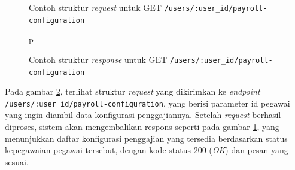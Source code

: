 \begin{figure}
    \centering
    \caption{Contoh struktur \textit{request} untuk GET \texttt{/users/{:user\_id}/payroll-configuration}}
    \label{fig:response_payroll_configuration_by_user_id_get}
\end{figure}
\begin{figure}p
    \centering
    \caption{Contoh struktur \textit{response} untuk GET \texttt{/users/{:user\_id}/payroll-configuration}}
    \label{fig:request_payroll_configuration_by_user_id_get}
\end{figure}
Pada gambar \ref{fig:request_payroll_configuration_by_user_id_get}, terlihat struktur \textit{request} yang dikirimkan ke \textit{endpoint} \texttt{/users/{:user\_id}/payroll-configuration}, yang berisi parameter id pegawai yang ingin diambil data konfigurasi penggajiannya. Setelah \textit{request} berhasil diproses, sistem akan mengembalikan respons seperti pada gambar \ref{fig:response_payroll_configuration_by_user_id_get}, yang menunjukkan daftar konfigurasi penggajian yang tersedia berdasarkan status kepegawaian pegawai tersebut, dengan kode status 200 (\textit{OK}) dan pesan yang sesuai.



